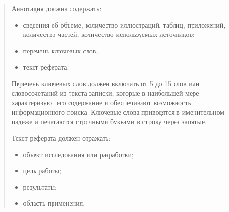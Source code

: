 \documentclass[
  english,
  russian,
  12pt,
  a4paper,
]{phdthesr}
\begin{document}



\begin{abstract}

  Аннотация должна содержать:
  \begin{itemize}
    \item  сведения об объеме, количество иллюстраций, таблиц, приложений, количество частей, количество используемых источников;
    \item  перечень ключевых слов;
    \item  текст реферата.
  \end{itemize}

  Перечень ключевых слов должен включать от 5 до 15 слов или словосочетаний из текста записки, которые в наибольшей мере характеризуют его содержание и обеспечивают возможность информационного поиска.
  Ключевые слова приводятся в именительном падеже и печатаются строчными буквами в строку через запятые.

  Текст реферата должен отражать:
  \begin{itemize}
    \item  объект исследования или разработки;
    \item  цель работы;
    \item  результаты;
    \item  область применения.
  \end{itemize}
\end{abstract}


\makeatletter

\end{document}
